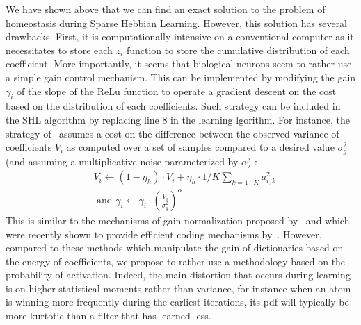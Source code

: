 \documentclass[letterpaper,final,conference,10pt]{IEEEtran}
\newcommand{\citep}[1]{\cite{#1}}
\newcommand{\seeFig}[1]{Figure~\ref{fig:#1}}%
\begin{document}
We have shown above that we can find an exact solution to the problem of homeostasis during Sparse Hebbian Learning. However, this solution has several drawbacks. First, it is computationally intensive on a conventional computer as it necessitates to store each $z_i$ function to store the cumulative distribution of each coefficient. More importantly, it seems that biological neurons seem to rather use a simple gain control mechanism. This can be implemented by modifying the gain $\gamma_i$ of the slope of the ReLu function to operate a gradient descent on the cost based on the distribution of each coefficients. Such strategy can be included in the SHL algorithm by replacing line 8 in the learning lgorithm. For instance, the strategy of~\citep{Olshausen97} assumes a cost on the difference between the observed variance of coefficients $V_i$ as computed over a set of samples compared to a desired value $\sigma_g^2$ (and assuming a multiplicative noise parameterized by $\alpha$) :
\begin{align}
&V_i \leftarrow (1- \eta_h ) \cdot V_i + \eta_h \cdot 1/K\sum_{k=1\cdots K} a_{i, k}^2 \\ &\textrm{ and }
\gamma_i \leftarrow \gamma_i \cdot \left( \frac{V_i}{\sigma_g^2} \right)^\alpha
\end{align}%
This is similar to the mechanisms of gain normalization proposed by~\cite{Schwartz01} and which were recently shown to provide efficient coding mechanisms by~\cite{Simoncelli17}. However, compared to these methods which manipulate the gain of dictionaries based on the energy of coefficients, we propose to rather use a methodology based on the probability of activation. Indeed, the main distortion that occurs during learning is on higher statistical moments rather than variance, for instance when an atom is winning more frequently during the earliest iterations, its pdf will typically be more kurtotic than a filter that has learned less.
\end{document}
